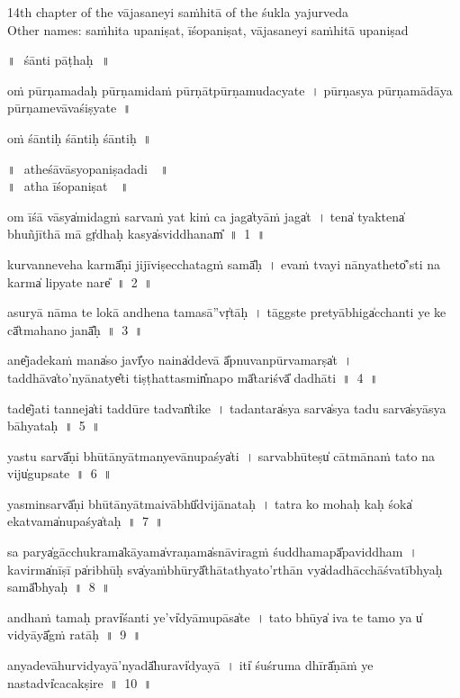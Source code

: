 \documentclass[parskip, DIV=14]{scrartcl}
\begin{document}
{\centering	


\large
14th chapter of the vājasaneyi saṁhitā of the śukla yajurveda\\
Other names:  saṁhita upaniṣat, īśopaniṣat, vājasaneyi saṁhitā upaniṣad

\Large
॥\,~śānti pāṭhaḥ\,~॥\\
\vspace{0.5cm}

oṁ pūrṇa॒mada॒ḥ pūrṇa॒mida॒ṁ pūrṇā॒tpūrṇa॒muda॒cyate~।
pūrṇa॒sya pūrṇa॒mādā॒ya pūrṇa॒mevāvaśi॒ṣyate~॥

oṁ śā॒ntiḥ śā॒ntiḥ śā॒ntiḥ~॥

॥\,~atheśāvāsyopaniṣadadi \,~॥\\
॥\,~atha īśopaniṣat \,~॥\\
\vspace{0.5cm}

om ī॒śā vā॒sya̍mi॒dagṁ sarva॒ṁ yat kiṁ ca॒ jaga̍tyā॒ṁ jaga̍t~।
tena̍ tya॒ktena̍ bhuñjīthā॒ mā gṛ̍dha॒ḥ kasya̍svi॒ddhanam̎~॥~1~॥

ku॒rvanne॒veha karmā̎ṇi jijīvi॒ṣeccha॒tagṁ samā̎ḥ~।
e॒vaṁ tvayi॒ nānyathe॒to̎'sti॒ na karma̍ lipyate॒ nare̎~॥~2~॥

a॒su॒ryā॒ nāma॒ te lo॒kā a॒ndhena॒ tama॒sā''vṛ̍tāḥ~।
tāggste pretyā॒bhiga̍cchanti॒ ye ke cā̎tma॒hano॒ janā̎ḥ~॥~3~॥

ane̎ja॒deka॒ṁ mana̍so॒ javī̎yo॒ naina̍dde॒vā ā̎pnuva॒npūrva॒marṣa̍t~।
taddhāva̍to॒'nyānatye̎ti॒ tiṣṭha॒ttasmin̎na॒po mā̎ta॒riśvā̎ dadhāti~॥~4~॥

tade̎jati॒ tanneja̍ti॒ taddū॒re tadvan̎ti॒ke~।
tada॒ntara̍sya॒ sarva̍sya॒ tadu॒ sarva̍syāsya bāhya॒taḥ~॥~5~॥

yastu sarvā̎ṇi bhū॒tānyā॒tmanye॒vānu॒paśya̍ti~।
sa॒rva॒bhū॒teṣu̍ cā॒tmāna॒ṁ tato॒ na viju̍gupsate~॥~6~॥

yasmi॒nsarvā̎ṇi bhū॒tānyā॒tmaivābhū̎dvijāna॒taḥ~।
tatra॒ ko moha॒ḥ kaḥ śoka̍ eka॒tvama̍nu॒paśya̍taḥ~॥~7~॥

sa parya̍gācchu॒krama̍kā॒yama̍vra॒ṇama̍snāvi॒ragṁ śu॒ddhamapā̎paviddham~।
ka॒virma̍nī॒ṣī pa̍ri॒bhūḥ sva̍ya॒ṁbhūryā̎thātathya॒to'rthā॒n vya̍dadhācchāśva॒tībhya॒ḥ samā̎bhyaḥ~॥~8~॥

a॒ndhaṁ tama॒ḥ pravi̍śanti॒ ye'vi̍dyāmu॒pāsa̍te~।
tato॒ bhūya̍ iva॒ te tamo॒ ya u̍ vi॒dyāyā̎gṁ ra॒tāḥ~॥~9~॥

a॒nyade॒vāhurvi॒dyayā॒'nyadā̎hu॒ravi̍dyayā~।
iti̍ śuśruma॒ dhīrā̎ṇā॒ṁ ye na॒stadvi̍cacakṣi॒re~॥~10~॥

}
\end{document}

